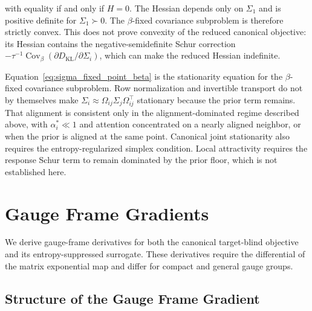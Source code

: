 \documentclass[twoside,11pt]{article}
\begin{document}
with equality if and only if $H=0$. The Hessian depends only on $\Sigma_1$ and is positive definite for $\Sigma_1\succ0$. The $\beta$-fixed covariance subproblem is therefore strictly convex. This does not prove convexity of the reduced canonical objective: its Hessian contains the negative-semidefinite Schur correction $-\tau^{-1}\operatorname{Cov}_\beta(\partial D_{\mathrm{KL}}/\partial\Sigma_i)$, which can make the reduced Hessian indefinite.

Equation~\eqref{eq:sigma_fixed_point_beta} is the stationarity equation for the $\beta$-fixed covariance subproblem. Row normalization and invertible transport do not by themselves make $\Sigma_i\approx\Omega_{ij}\Sigma_j\Omega_{ij}^\top$ stationary because the prior term remains. That alignment is consistent only in the alignment-dominated regime described above, with $\alpha_i^*\ll1$ and attention concentrated on a nearly aligned neighbor, or when the prior is aligned at the same point. Canonical joint stationarity also requires the entropy-regularized simplex condition. Local attractivity requires the response Schur term to remain dominated by the prior floor, which is not established here.


\section{Gauge Frame Gradients}
\label{app:phi_gradients}

We derive gauge-frame derivatives for both the canonical target-blind objective and its entropy-suppressed surrogate. These derivatives require the differential of the matrix exponential map and differ for compact and general gauge groups.

\subsection{Structure of the Gauge Frame Gradient}
\end{document}
